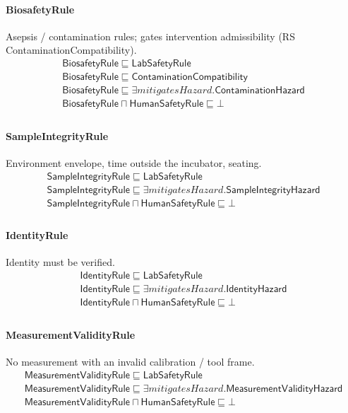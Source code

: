 \documentclass[10pt]{article}
\begin{document}
\paragraph{BiosafetyRule} Asepsis / contamination rules; gates intervention admissibility (RS ContaminationCompatibility).
\[\begin{array}{l}
\mathsf{BiosafetyRule} \sqsubseteq  \mathsf{LabSafetyRule} \\
\mathsf{BiosafetyRule} \sqsubseteq  \mathsf{ContaminationCompatibility} \\
\mathsf{BiosafetyRule} \sqsubseteq  \exists \mathit{mitigatesHazard}.\mathsf{ContaminationHazard} \\
\mathsf{BiosafetyRule} \sqcap  \mathsf{HumanSafetyRule} \sqsubseteq  \bot  \\
\end{array}\]
\paragraph{SampleIntegrityRule} Environment envelope, time outside the incubator, seating.
\[\begin{array}{l}
\mathsf{SampleIntegrityRule} \sqsubseteq  \mathsf{LabSafetyRule} \\
\mathsf{SampleIntegrityRule} \sqsubseteq  \exists \mathit{mitigatesHazard}.\mathsf{SampleIntegrityHazard} \\
\mathsf{SampleIntegrityRule} \sqcap  \mathsf{HumanSafetyRule} \sqsubseteq  \bot  \\
\end{array}\]
\paragraph{IdentityRule} Identity must be verified.
\[\begin{array}{l}
\mathsf{IdentityRule} \sqsubseteq  \mathsf{LabSafetyRule} \\
\mathsf{IdentityRule} \sqsubseteq  \exists \mathit{mitigatesHazard}.\mathsf{IdentityHazard} \\
\mathsf{IdentityRule} \sqcap  \mathsf{HumanSafetyRule} \sqsubseteq  \bot  \\
\end{array}\]
\paragraph{MeasurementValidityRule} No measurement with an invalid calibration / tool frame.
\[\begin{array}{l}
\mathsf{MeasurementValidityRule} \sqsubseteq  \mathsf{LabSafetyRule} \\
\mathsf{MeasurementValidityRule} \sqsubseteq  \exists \mathit{mitigatesHazard}.\mathsf{MeasurementValidityHazard} \\
\mathsf{MeasurementValidityRule} \sqcap  \mathsf{HumanSafetyRule} \sqsubseteq  \bot  \\
\end{array}\]
\end{document}
